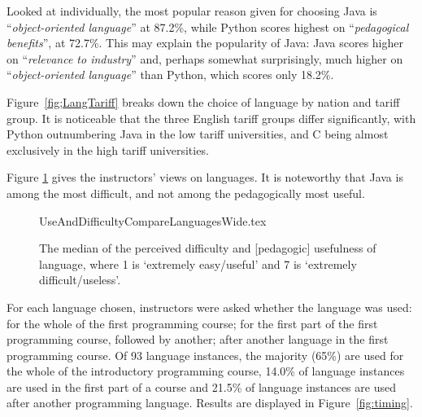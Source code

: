 \documentclass[a4paper,11pt]{article}
\begin{document}
Looked at individually, the most popular reason given for choosing
Java is ``{\emph{object-oriented language}}'' at 87.2\%, while Python
scores highest on ``{\emph{pedagogical benefits}}'', at 72.7\%. This
may explain the popularity of Java: Java scores higher on
``{\emph{relevance to industry}}'' and, perhaps somewhat surprisingly,
much higher on ``{\emph{object-oriented language}}'' than Python,
which scores only 18.2\%.


Figure~\ref{fig;LangTariff} breaks down the choice of language by
nation and tariff group.  It is noticeable that the three English
tariff groups differ significantly, with Python outnumbering Java in
the low tariff universities, and C being almost exclusively in the
high tariff universities.



Figure \ref{fig:utility} gives the instructors' views on languages. It
is noteworthy that Java is among the most difficult, and not among the
pedagogically most useful.

\begin{figure}
\begin{center}
{UseAndDifficultyCompareLanguagesWide.tex}
\end{center}
\caption{The median of the perceived difficulty and [pedagogic] usefulness of language, where 1 is `extremely easy/useful' and 7 is `extremely difficult/useless'.%
\label{fig:utility}}
\end{figure}

For each language chosen, instructors were asked whether the language was used: for the whole of the first programming course; for the first part of the first programming course, followed by another; after another language in the first programming course. Of 93
language instances, the majority (65\%) are used for the whole of the
introductory programming course, 14.0\% of language instances are used
in the first part of a course and 21.5\% of language instances are
used after another programming language. Results are displayed in Figure~\ref{fig:timing}.
\end{document}
